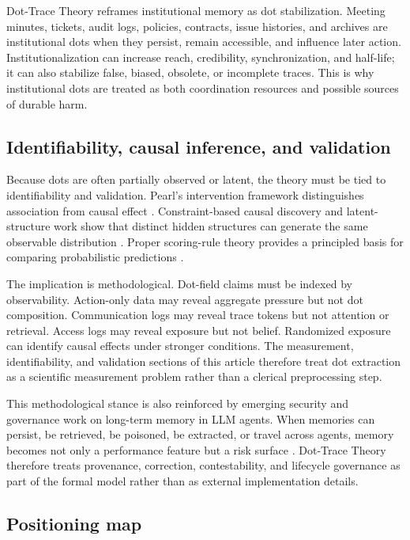 \documentclass[11pt]{article}
\theoremstyle{remark}
\begin{document}
Dot-Trace Theory reframes institutional memory as dot stabilization. Meeting minutes, tickets, audit logs, policies, contracts, issue histories, and archives are institutional dots when they persist, remain accessible, and influence later action. Institutionalization can increase reach, credibility, synchronization, and half-life; it can also stabilize false, biased, obsolete, or incomplete traces. This is why institutional dots are treated as both coordination resources and possible sources of durable harm.

\subsection{Identifiability, causal inference, and validation}\label{identifiability-causal-inference-validation}

Because dots are often partially observed or latent, the theory must be tied to identifiability and validation. Pearl's intervention framework distinguishes association from causal effect \citep{pearl2009causality}. Constraint-based causal discovery and latent-structure work show that distinct hidden structures can generate the same observable distribution \citep{spirtes2000causation}. Proper scoring-rule theory provides a principled basis for comparing probabilistic predictions \citep{gneiting2007proper}.

The implication is methodological. Dot-field claims must be indexed by observability. Action-only data may reveal aggregate pressure but not dot composition. Communication logs may reveal trace tokens but not attention or retrieval. Access logs may reveal exposure but not belief. Randomized exposure can identify causal effects under stronger conditions. The measurement, identifiability, and validation sections of this article therefore treat dot extraction as a scientific measurement problem rather than a clerical preprocessing step.

This methodological stance is also reinforced by emerging security and governance work on long-term memory in LLM agents. When memories can persist, be retrieved, be poisoned, be extracted, or travel across agents, memory becomes not only a performance feature but a risk surface \citep{securitymemory2026}. Dot-Trace Theory therefore treats provenance, correction, contestability, and lifecycle governance as part of the formal model rather than as external implementation details.


\subsection{Positioning map}\label{positioning-map}
\end{document}
